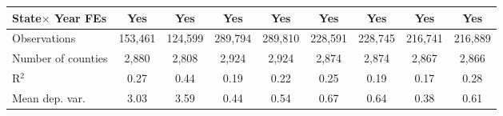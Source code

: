 {\begin{tabular}{l*{8}{c}}
\addlinespace
State$\times$ Year FEs &         Yes         &         Yes         &         Yes         &         Yes         &         Yes         &         Yes         &         Yes         &         Yes         \\
\midrule
Observations        &     153,461         &     124,599         &     289,794         &     289,810         &     228,591         &     228,745         &     216,741         &     216,889         \\
Number of counties  &       2,880         &       2,808         &       2,924         &       2,924         &       2,874         &       2,874         &       2,867         &       2,866         \\
R$^2$               &        0.27         &        0.44         &        0.19         &        0.22         &        0.25         &        0.19         &        0.17         &        0.28         \\
Mean dep. var.      &        3.03         &        3.59         &        0.44         &        0.54         &        0.67         &        0.64         &        0.38         &        0.61         \\
\bottomrule
\end{tabular}
}
